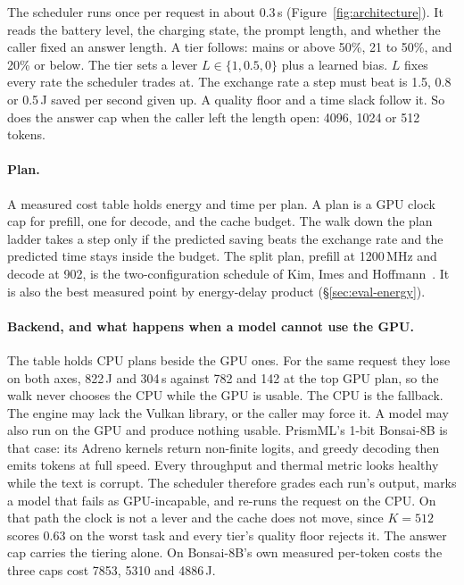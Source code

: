 \documentclass[sigconf, anonymous=false, screen=true]{acmart}
\begin{document}
The scheduler runs once per request in about 0.3\,s (Figure~\ref{fig:architecture}). It reads the battery level, the charging state, the prompt length, and whether the caller fixed an answer length. A tier follows: mains or above 50\%, 21 to 50\%, and 20\% or below. The tier sets a lever $L\in\{1, 0.5, 0\}$ plus a learned bias. $L$ fixes every rate the scheduler trades at. The exchange rate a step must beat is 1.5, 0.8 or 0.5\,J saved per second given up. A quality floor and a time slack follow it. So does the answer cap when the caller left the length open: 4096, 1024 or 512 tokens.

\paragraph{Plan.} A measured cost table holds energy and time per plan. A plan is a GPU clock cap for prefill, one for decode, and the cache budget. The walk down the plan ladder takes a step only if the predicted saving beats the exchange rate and the predicted time stays inside the budget. The split plan, prefill at 1200\,MHz and decode at 902, is the two-configuration schedule of Kim, Imes and Hoffmann~\cite{kim2015racepace}. It is also the best measured point by energy-delay product (\S\ref{sec:eval-energy}).

\paragraph{Backend, and what happens when a model cannot use the GPU.} The table holds CPU plans beside the GPU ones. For the same request they lose on both axes, 822\,J and 304\,s against 782 and 142 at the top GPU plan, so the walk never chooses the CPU while the GPU is usable. The CPU is the fallback. The engine may lack the Vulkan library, or the caller may force it. A model may also run on the GPU and produce nothing usable. PrismML's 1-bit Bonsai-8B is that case: its Adreno kernels return non-finite logits, and greedy decoding then emits tokens at full speed. Every throughput and thermal metric looks healthy while the text is corrupt. The scheduler therefore grades each run's output, marks a model that fails as GPU-incapable, and re-runs the request on the CPU. On that path the clock is not a lever and the cache does not move, since $K{=}512$ scores 0.63 on the worst task and every tier's quality floor rejects it. The answer cap carries the tiering alone. On Bonsai-8B's own measured per-token costs the three caps cost 7853, 5310 and 4886\,J.
\end{document}
